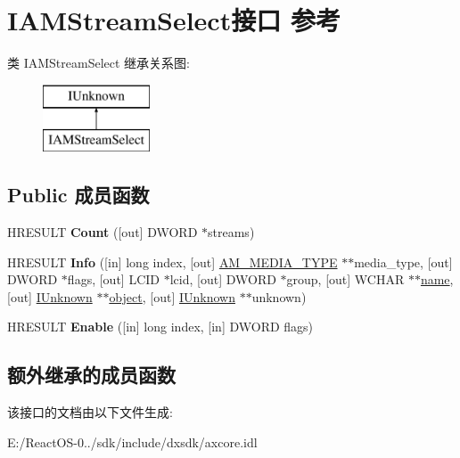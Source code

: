 \hypertarget{interface_i_a_m_stream_select}{}\section{I\+A\+M\+Stream\+Select接口 参考}
\label{interface_i_a_m_stream_select}
类 I\+A\+M\+Stream\+Select 继承关系图\+:\begin{figure}[H]
\begin{center}
\leavevmode
\includegraphics[height=2.000000cm]{interface_i_a_m_stream_select}
\end{center}
\end{figure}
\subsection*{Public 成员函数}
\begin{DoxyCompactItemize}
\item 
\mbox{\label{interface_i_a_m_stream_select_ab2c7055dcdf369bc9e54fe19fb1aa261}} 
H\+R\+E\+S\+U\+LT {\bfseries Count} (\mbox{[}out\mbox{]} D\+W\+O\+RD $\ast$streams)
\item 
\mbox{\label{interface_i_a_m_stream_select_a9102605643a7b21a817572c4b82f41e9}} 
H\+R\+E\+S\+U\+LT {\bfseries Info} (\mbox{[}in\mbox{]} long index, \mbox{[}out\mbox{]} \hyperlink{struct_a_m___m_e_d_i_a___t_y_p_e}{A\+M\+\_\+\+M\+E\+D\+I\+A\+\_\+\+T\+Y\+PE} $\ast$$\ast$media\+\_\+type, \mbox{[}out\mbox{]} D\+W\+O\+RD $\ast$flags, \mbox{[}out\mbox{]} L\+C\+ID $\ast$lcid, \mbox{[}out\mbox{]} D\+W\+O\+RD $\ast$group, \mbox{[}out\mbox{]} W\+C\+H\+AR $\ast$$\ast$\hyperlink{structname}{name}, \mbox{[}out\mbox{]} \hyperlink{interface_i_unknown}{I\+Unknown} $\ast$$\ast$\hyperlink{structobject}{object}, \mbox{[}out\mbox{]} \hyperlink{interface_i_unknown}{I\+Unknown} $\ast$$\ast$unknown)
\item 
\mbox{\label{interface_i_a_m_stream_select_a368e9475b7f873bad32fba2656d34892}} 
H\+R\+E\+S\+U\+LT {\bfseries Enable} (\mbox{[}in\mbox{]} long index, \mbox{[}in\mbox{]} D\+W\+O\+RD flags)
\end{DoxyCompactItemize}
\subsection*{额外继承的成员函数}


该接口的文档由以下文件生成\+:\begin{DoxyCompactItemize}
\item 
E\+:/\+React\+O\+S-\/0../sdk/include/dxsdk/axcore.\+idl\end{DoxyCompactItemize}
